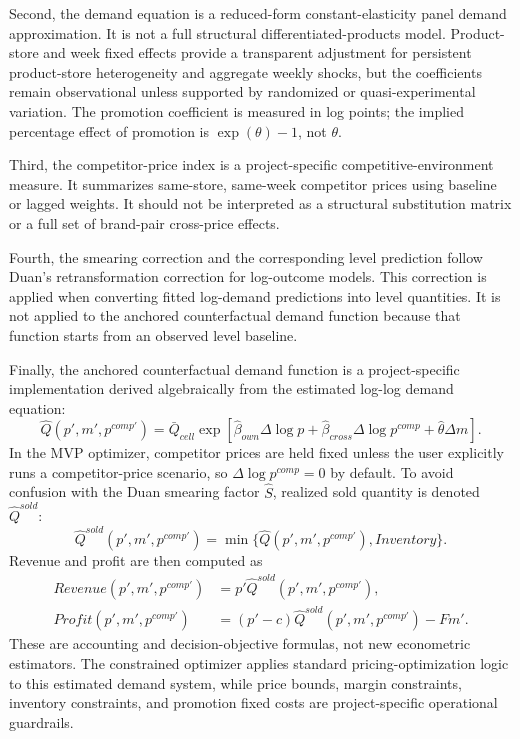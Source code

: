 \documentclass[11pt]{article}
\begin{document}
Second, the demand equation is a reduced-form constant-elasticity panel demand approximation. It is not a full structural differentiated-products model. Product-store and week fixed effects provide a transparent adjustment for persistent product-store heterogeneity and aggregate weekly shocks, but the coefficients remain observational unless supported by randomized or quasi-experimental variation. The promotion coefficient is measured in log points; the implied percentage effect of promotion is $\exp(\theta)-1$, not $\theta$.

Third, the competitor-price index is a project-specific competitive-environment measure. It summarizes same-store, same-week competitor prices using baseline or lagged weights. It should not be interpreted as a structural substitution matrix or a full set of brand-pair cross-price effects.

Fourth, the smearing correction and the corresponding level prediction follow Duan's retransformation correction for log-outcome models. This correction is applied when converting fitted log-demand predictions into level quantities. It is not applied to the anchored counterfactual demand function because that function starts from an observed level baseline.

Finally, the anchored counterfactual demand function is a project-specific implementation derived algebraically from the estimated log-log demand equation:
\begin{equation}
\widehat{Q}(p',m',p^{comp\prime})
=
\bar{Q}_{cell}
\exp\left[
\widehat{\beta}_{own}\Delta \log p
+
\widehat{\beta}_{cross}\Delta \log p^{comp}
+
\widehat{\theta}\Delta m
\right].
\end{equation}
In the MVP optimizer, competitor prices are held fixed unless the user explicitly runs a competitor-price scenario, so $\Delta\log p^{comp}=0$ by default. To avoid confusion with the Duan smearing factor $\widehat{S}$, realized sold quantity is denoted $\widehat{Q}^{sold}$:
\begin{equation}
\widehat{Q}^{sold}(p',m',p^{comp\prime})
=
\min\{
\widehat{Q}(p',m',p^{comp\prime}),Inventory
\}.
\end{equation}
Revenue and profit are then computed as
\begin{align}
Revenue(p',m',p^{comp\prime})
&=
p'\widehat{Q}^{sold}(p',m',p^{comp\prime}), \\
Profit(p',m',p^{comp\prime})
&=
(p'-c)\widehat{Q}^{sold}(p',m',p^{comp\prime})
-
Fm'.
\end{align}
These are accounting and decision-objective formulas, not new econometric estimators. The constrained optimizer applies standard pricing-optimization logic to this estimated demand system, while price bounds, margin constraints, inventory constraints, and promotion fixed costs are project-specific operational guardrails.
\end{document}
